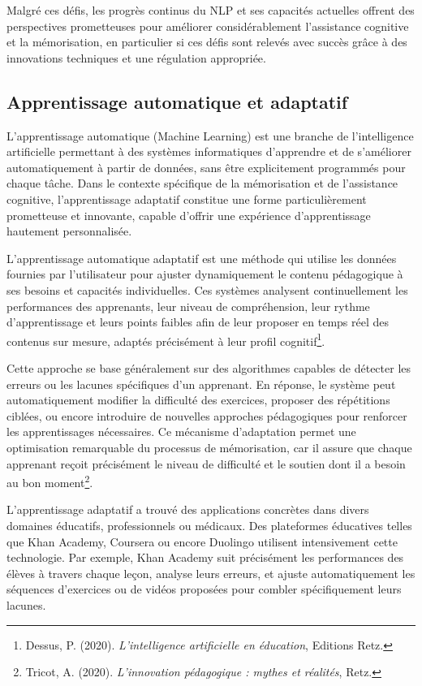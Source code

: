 \documentclass[12pt,a4paper]{report}
\begin{document}
Malgré ces défis, les progrès continus du NLP et ses capacités actuelles offrent des perspectives prometteuses pour améliorer considérablement l’assistance cognitive et la mémorisation, en particulier si ces défis sont relevés avec succès grâce à des innovations techniques et une régulation appropriée.

\subsection{Apprentissage automatique et adaptatif}

L'apprentissage automatique (Machine Learning) est une branche de l’intelligence artificielle permettant à des systèmes informatiques d’apprendre et de s'améliorer automatiquement à partir de données, sans être explicitement programmés pour chaque tâche. Dans le contexte spécifique de la mémorisation et de l’assistance cognitive, l'apprentissage adaptatif constitue une forme particulièrement prometteuse et innovante, capable d’offrir une expérience d’apprentissage hautement personnalisée.

L’apprentissage automatique adaptatif est une méthode qui utilise les données fournies par l’utilisateur pour ajuster dynamiquement le contenu pédagogique à ses besoins et capacités individuelles. Ces systèmes analysent continuellement les performances des apprenants, leur niveau de compréhension, leur rythme d'apprentissage et leurs points faibles afin de leur proposer en temps réel des contenus sur mesure, adaptés précisément à leur profil cognitif\footnote{Dessus, P. (2020). \textit{L'intelligence artificielle en éducation}, Editions Retz.}.

Cette approche se base généralement sur des algorithmes capables de détecter les erreurs ou les lacunes spécifiques d’un apprenant. En réponse, le système peut automatiquement modifier la difficulté des exercices, proposer des répétitions ciblées, ou encore introduire de nouvelles approches pédagogiques pour renforcer les apprentissages nécessaires. Ce mécanisme d’adaptation permet une optimisation remarquable du processus de mémorisation, car il assure que chaque apprenant reçoit précisément le niveau de difficulté et le soutien dont il a besoin au bon moment\footnote{Tricot, A. (2020). \textit{L'innovation pédagogique : mythes et réalités}, Retz.}.

L’apprentissage adaptatif a trouvé des applications concrètes dans divers domaines éducatifs, professionnels ou médicaux. Des plateformes éducatives telles que Khan Academy, Coursera ou encore Duolingo utilisent intensivement cette technologie. Par exemple, Khan Academy suit précisément les performances des élèves à travers chaque leçon, analyse leurs erreurs, et ajuste automatiquement les séquences d’exercices ou de vidéos proposées pour combler spécifiquement leurs lacunes.
\end{document}
